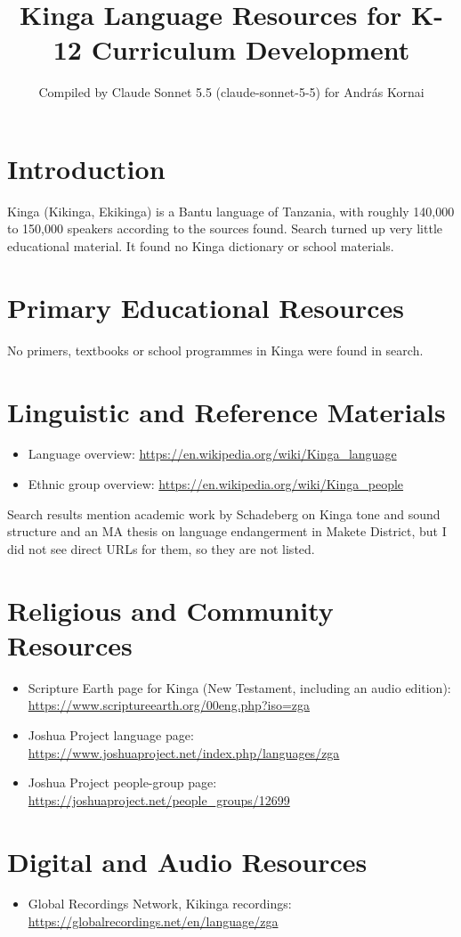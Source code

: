 \documentclass[12pt]{article}
\title{Kinga Language Resources for K-12 Curriculum Development}
\author{Compiled by Claude Sonnet 5.5 (claude-sonnet-5-5) for Andr\'as Kornai}
\date{}
\begin{document}
\maketitle

\section{Introduction}
Kinga (Kikinga, Ekikinga) is a Bantu language of Tanzania, with roughly 140,000 to 150,000 speakers according to the sources found. Search turned up very little educational material. It found no Kinga dictionary or school materials.

\section{Primary Educational Resources}
No primers, textbooks or school programmes in Kinga were found in search.

\section{Linguistic and Reference Materials}
\begin{itemize}
\item Language overview: \url{https://en.wikipedia.org/wiki/Kinga_language}
\item Ethnic group overview: \url{https://en.wikipedia.org/wiki/Kinga_people}
\end{itemize}
Search results mention academic work by Schadeberg on Kinga tone and sound structure and an MA thesis on language endangerment in Makete District, but I did not see direct URLs for them, so they are not listed.

\section{Religious and Community Resources}
\begin{itemize}
\item Scripture Earth page for Kinga (New Testament, including an audio edition): \url{https://www.scriptureearth.org/00eng.php?iso=zga}
\item Joshua Project language page: \url{https://www.joshuaproject.net/index.php/languages/zga}
\item Joshua Project people-group page: \url{https://joshuaproject.net/people_groups/12699}
\end{itemize}

\section{Digital and Audio Resources}
\begin{itemize}
\item Global Recordings Network, Kikinga recordings: \url{https://globalrecordings.net/en/language/zga}
\end{itemize}
\end{document}
